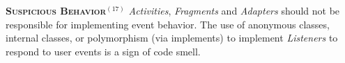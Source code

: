   \noindent
  \textsc{\textbf{{\small Suspicious Behavior}}}$^{(17)}$ \textit{Activities}, \textit{Fragments} and \textit{Adapters} should not be responsible for implementing event behavior. The use of anonymous classes, internal classes, or polymorphism (via implements) to implement \textit{Listeners} to respond to user events is a sign of code smell.




